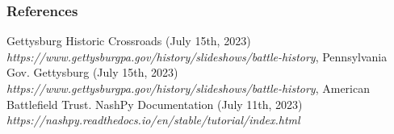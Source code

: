 \documentclass{beamer}
\begin{document}
\begin{frame}
  \frametitle{References}
   
  \begin{thebibliography}{9}
  \bibitem  Gettysburg Historic Crossroads (July 15th, 2023) \emph {https://www.gettysburgpa.gov/history/slideshows/battle-history}, Pennsylvania Gov.
  \bibitem  Gettysburg (July 15th, 2023) \emph {https://www.gettysburgpa.gov/history/slideshows/battle-history}, American Battlefield Trust.
  \bibitem  NashPy Documentation (July 11th, 2023) \emph{https://nashpy.readthedocs.io/en/stable/tutorial/index.html}
  \end{thebibliography}
\end{frame}
\end{document}
